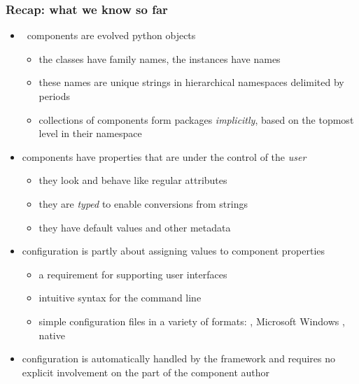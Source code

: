 \begin{frame}
%
  \frametitle{Recap: what we know so far}
%
  \begin{itemize}
%
  \item \pyre\ components are evolved python objects
    \begin{itemize}
    \item the classes have family names, the instances have names
    \item these names are unique strings in hierarchical namespaces delimited by periods
    \item collections of components form packages \emph{implicitly}, based on the topmost level
      in their namespace
    \end{itemize}
%
  \item components have properties that are under the control of the \emph{user}
    \begin{itemize}
    \item they look and behave like regular attributes
    \item they are \emph{typed} to enable conversions from strings
    \item they have default values and other metadata
    \end{itemize}
%
  \item configuration is partly about assigning values to component properties
    \begin{itemize}
    \item a requirement for supporting user interfaces
    \item intuitive syntax for the command line
    \item simple configuration files in a variety of formats: , Microsoft
      Windows , native 
    \end{itemize}
%
  \item configuration is automatically handled by the framework and requires no explicit
    involvement on the part of the component author
%
  \end{itemize}
%
\end{frame}

